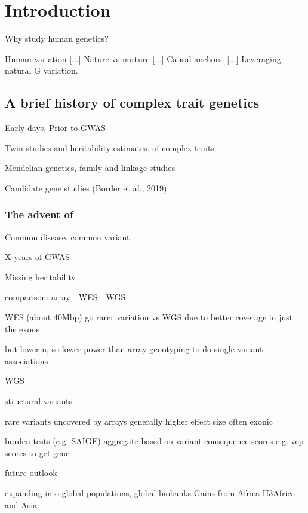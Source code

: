 %
%

\chapter{Introduction}

Why study human genetics?

Human variation
[...]
Nature vs nurture
[...]
Causal anchors.
[...]
Leveraging natural G variation.

\section{A brief history of complex trait genetics}

Early days, Prior to GWAS

Twin studies and heritability estimates.
    of complex traits

Mendelian genetics, family and linkage studies

Candidate gene studies (Border et al., 2019)

\subsection{The advent of }

Common disease, common variant

X years of GWAS

Missing heritability

comparison: array - WES - WGS

WES (about 40Mbp)
        go rarer variation vs WGS
            due to better coverage in just the exons

        but lower n,
            so lower power than array genotyping to do single variant associations

    WGS

        structural variants

        rare variants
            uncovered by arrays
            generally higher effect size
            often exonic

            burden tests (e.g. SAIGE)
                aggregate based on variant consequence scores e.g. vep scores
                to get gene

future outlook

    expanding into global populations, global biobanks
        Gains from Africa H3Africa
        and Asia

